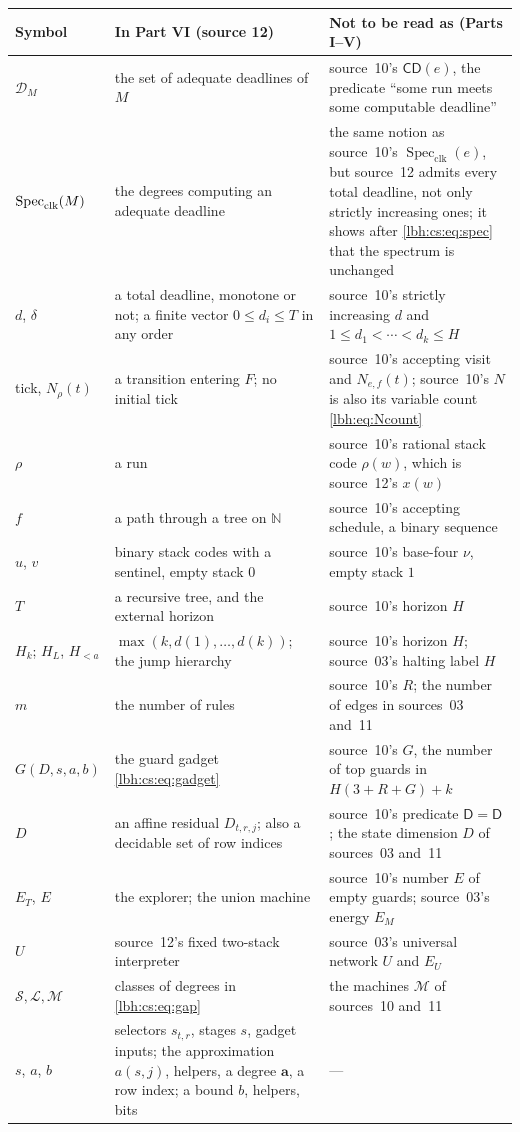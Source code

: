 \documentclass[11pt,letterpaper]{article}
\theoremstyle{definition}
\theoremstyle{remark}
\newcommand{\N}{\mathbb N}
\newcommand{\Clock}{\mathsf{CD}}
\newcommand{\Fixed}{\mathsf{D}}
\newcommand{\1}{\mathbf 1}
\newcommand{\csSpec}{\operatorname{Spec}_{\rm clk}}
\newcommand{\csClock}{\mathcal D}
\begin{document}
\begin{center}
\small
\begin{longtable}{@{}p{}p{}p{}@{}}
\toprule
Symbol & In Part VI (source 12) & Not to be read as (Parts I--V)\\
\midrule
\endhead
$\csClock_M$ & the set of adequate deadlines of $M$ & source~10's $\Clock(e)$, the predicate
``some run meets some computable deadline''\\
$\csSpec(M)$ & the degrees computing an adequate deadline & the same notion as source~10's
$\operatorname{Spec}_{\mathrm{clk}}(e)$, but source~12 admits every total deadline, not only
strictly increasing ones; it shows after \eqref{lbh:cs:eq:spec} that the spectrum is unchanged\\
$d$, $\delta$ & a total deadline, monotone or not; a finite vector $0\le d_i\le T$ in any order &
source~10's strictly increasing $d$ and $1\le d_1<\cdots<d_k\le H$\\
tick, $N_\rho(t)$ & a transition entering $F$; no initial tick & source~10's accepting visit and
$N_{e,f}(t)$; source~10's $N$ is also its variable count \eqref{lbh:eq:Ncount}\\
$\rho$ & a run & source~10's rational stack code $\rho(w)$, which is source~12's $x(w)$\\
$f$ & a path through a tree on $\N$ & source~10's accepting schedule, a binary sequence\\
$u$, $v$ & binary stack codes with a sentinel, empty stack $0$ & source~10's base-four $\nu$, empty
stack $1$\\
$T$ & a recursive tree, and the external horizon & source~10's horizon $H$\\
$H_k$; $H_L$, $H_{<a}$ & $\max(k,d(1),\ldots,d(k))$; the jump hierarchy & source~10's horizon $H$;
source~03's halting label $H$\\
$m$ & the number of rules & source~10's $R$; the number of edges in sources~03 and~11\\
$G(D,s,a,b)$ & the guard gadget \eqref{lbh:cs:eq:gadget} & source~10's $G$, the number of top
guards in $H(3+R+G)+k$\\
$D$ & an affine residual $D_{t,r,j}$; also a decidable set of row indices & source~10's predicate
$\Fixed=\mathsf D$; the state dimension $D$ of sources~03 and~11\\
$E_T$, $E$ & the explorer; the union machine & source~10's number $E$ of empty guards; source~03's
energy $E_M$\\
$U$ & source~12's fixed two-stack interpreter & source~03's universal network $U$ and $E_U$\\
$\mathcal S,\mathcal L,\mathcal M$ & classes of degrees in \eqref{lbh:cs:eq:gap} & the machines
$\mathcal M$ of sources~10 and~11\\
$s$, $a$, $b$ & selectors $s_{t,r}$, stages $s$, gadget inputs; the approximation $a(s,j)$, helpers,
a degree $\mathbf a$, a row index; a bound $b$, helpers, bits & ---\\
\bottomrule
\end{longtable}
\end{center}
\end{document}
